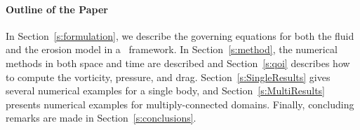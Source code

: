\documentclass[preprint, 10pt]{elsarticle}
\begin{document}
\paragraph{Outline of the Paper}
In Section~\ref{s:formulation}, we describe the governing equations for
both the fluid and the erosion model in a \thL~framework.  In
Section~\ref{s:method}, the numerical methods in both space and time are
described and Section~\ref{s:qoi} describes how to compute the
vorticity, pressure, and drag.  Section~\ref{s:SingleResults} gives
several numerical examples for a single body, and
Section~\ref{s:MultiResults} presents numerical examples for
multiply-connected domains.  Finally, concluding remarks are made in
Section~\ref{s:conclusions}.

\end{document}
